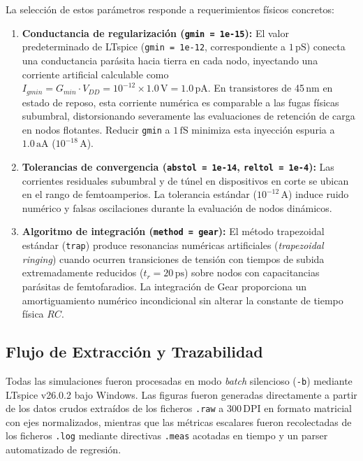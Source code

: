 La selección de estos parámetros responde a requerimientos físicos concretos:
\begin{enumerate}[leftmargin=1.4em,itemsep=0.12em]
  \item \textbf{Conductancia de regularización (\texttt{gmin = 1e-15}):} El valor predeterminado de LTspice (\texttt{gmin = 1e-12}, correspondiente a $1\,\text{pS}$) conecta una conductancia parásita hacia tierra en cada nodo, inyectando una corriente artificial calculable como $I_{gmin} = G_{min} \cdot V_{DD} = 10^{-12} \times 1.0\,\text{V} = 1.0\,\text{pA}$. En transistores de 45\,nm en estado de reposo, esta corriente numérica es comparable a las fugas físicas subumbral, distorsionando severamente las evaluaciones de retención de carga en nodos flotantes. Reducir \texttt{gmin} a $1\,\text{fS}$ minimiza esta inyección espuria a $1.0\,\text{aA}$ ($10^{-18}\,\text{A}$).
  \item \textbf{Tolerancias de convergencia (\texttt{abstol = 1e-14}, \texttt{reltol = 1e-4}):} Las corrientes residuales subumbral y de túnel en dispositivos en corte se ubican en el rango de femtoamperios. La tolerancia estándar ($10^{-12}\,\text{A}$) induce ruido numérico y falsas oscilaciones durante la evaluación de nodos dinámicos.
  \item \textbf{Algoritmo de integración (\texttt{method = gear}):} El método trapezoidal estándar (\texttt{trap}) produce resonancias numéricas artificiales (\textit{trapezoidal ringing}) cuando ocurren transiciones de tensión con tiempos de subida extremadamente reducidos ($t_r = 20\,\text{ps}$) sobre nodos con capacitancias parásitas de femtofaradios. La integración de Gear proporciona un amortiguamiento numérico incondicional sin alterar la constante de tiempo física $RC$.
\end{enumerate}

\subsection{Flujo de Extracción y Trazabilidad}
Todas las simulaciones fueron procesadas en modo \textit{batch} silencioso (\texttt{-b}) mediante LTspice v26.0.2 bajo Windows. Las figuras fueron generadas directamente a partir de los datos crudos extraídos de los ficheros \texttt{.raw} a 300\,DPI en formato matricial con ejes normalizados, mientras que las métricas escalares fueron recolectadas de los ficheros \texttt{.log} mediante directivas \texttt{.meas} acotadas en tiempo y un parser automatizado de regresión.

